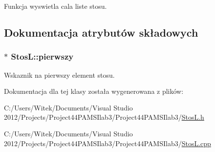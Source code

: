 Funkcja wyswietla cala liste stosu. 



\subsection{Dokumentacja atrybutów składowych}
\hypertarget{class_stos_l_a50de812f4b155571f88ea4ac6a0d5982}{
\subsubsection[{pierwszy}]{$\ast$ Stos\-L\-::pierwszy}}\label{class_stos_l_a50de812f4b155571f88ea4ac6a0d5982}


Wskaznik na pierwszy element stosu. 



Dokumentacja dla tej klasy została wygenerowana z plików\-:\begin{DoxyCompactItemize}
\item 
C\-:/\-Users/\-Witek/\-Documents/\-Visual Studio 2012/\-Projects/\-Project44\-P\-A\-M\-S\-Ilab3/\-Project44\-P\-A\-M\-S\-Ilab3/\hyperlink{_stos_l_8h}{Stos\-L.\-h}\item 
C\-:/\-Users/\-Witek/\-Documents/\-Visual Studio 2012/\-Projects/\-Project44\-P\-A\-M\-S\-Ilab3/\-Project44\-P\-A\-M\-S\-Ilab3/\hyperlink{_stos_l_8cpp}{Stos\-L.\-cpp}\end{DoxyCompactItemize}
